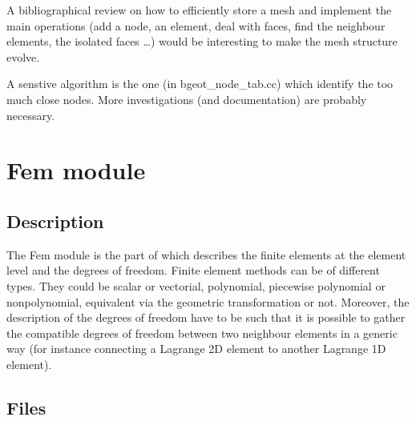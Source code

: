 \documentclass[a4paper,11pt,english]{sphinxmanual}
\begin{document}
A  bibliographical review on how to efficiently store a mesh and implement the main operations (add a node, an element, deal with faces, find the neighbour elements, the isolated faces …) would be interesting to make the mesh structure evolve.

A senstive algorithm is the one (in bgeot\_node\_tab.cc) which identify the too much close nodes. More investigations (and documentation) are probably necessary.


\section{Fem module}
\label{\detokenize{project/libdesc_fem:fem-module}}\label{\detokenize{project/libdesc_fem:dp-libdesc-fem}}\label{\detokenize{project/libdesc_fem::doc}}

\subsection{Description}
\label{\detokenize{project/libdesc_fem:description}}
The Fem module is the part of  which describes the finite elements at the
element level and the degrees of freedom. Finite element methods can be of
different types. They could be scalar or vectorial, polynomial, piecewise
polynomial or non\sphinxhyphen{}polynomial, equivalent via the geometric transformation or not.
Moreover, the description of the degrees of freedom have to be such that it is
possible to gather the compatible degrees of freedom between two neighbour
elements in a generic way (for instance connecting a Lagrange 2D element to
another Lagrange 1D element).


\subsection{Files}
\label{\detokenize{project/libdesc_fem:files}}
\end{document}

